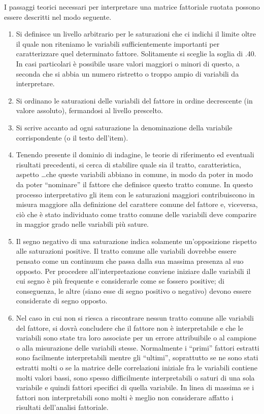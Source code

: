 \documentclass[
  11pt,
]{krantz}
\theoremstyle{definition}
\theoremstyle{definition}
\theoremstyle{definition}
\theoremstyle{definition}
\theoremstyle{remark}
\begin{document}
I passaggi teorici necessari per interpretare una matrice fattoriale ruotata possono essere descritti nel modo seguente.

\begin{enumerate}
\def\labelenumi{\arabic{enumi}.}
\item
  Si definisce un livello arbitrario per le saturazioni che ci indichi il limite oltre il quale non riteniamo le variabili sufficientemente importanti per caratterizzare quel determinato fattore. Solitamente si sceglie la soglia di .40. In casi particolari è possibile usare valori maggiori o minori di questo, a seconda che si abbia un numero ristretto o troppo ampio di variabili da interpretare.
\item
  Si ordinano le saturazioni delle variabili del fattore in ordine decrescente (in valore assoluto), fermandosi al livello prescelto.
\item
  Si scrive accanto ad ogni saturazione la denominazione della variabile corrispondente (o il testo dell'item).
\item
  Tenendo presente il dominio di indagine, le teorie di riferimento ed eventuali risultati precedenti, si cerca di stabilire quale sia il tratto, caratteristica, aspetto \ldots che queste variabili abbiano in comune, in modo da poter in modo da poter ``nominare'' il fattore che definisce questo tratto comune. In questo processo interpretativo gli item con le saturazioni maggiori contribuiscono in misura maggiore alla definizione del carattere comune del fattore e, viceversa, ciò che è stato individuato come tratto comune delle variabili deve comparire in maggior grado nelle variabili più sature.
\item
  Il segno negativo di una saturazione indica solamente un'opposizione rispetto alle saturazioni positive. Il tratto comune alle variabili dovrebbe essere pensato come un continuum che passa dalla sua massima presenza al suo opposto. Per procedere all'interpretazione conviene iniziare dalle variabili il cui segno è più frequente e considerarle come se fossero positive; di conseguenza, le altre (siano esse di segno positivo o negativo) devono essere considerate di segno opposto.
\item
  Nel caso in cui non si riesca a riscontrare nessun tratto comune alle variabili del fattore, si dovrà concludere che il fattore non è interpretabile e che le variabili sono state tra loro associate per un errore attribuibile o al campione o alla misurazione delle variabili stesse. Normalmente i ``primi'' fattori estratti sono facilmente interpretabili mentre gli ``ultimi'', soprattutto se ne sono stati estratti molti o se la matrice delle correlazioni iniziale fra le variabili contiene molti valori bassi, sono spesso difficilmente interpretabili o saturi di una sola variabile e quindi fattori specifici di quella variabile. In linea di massima se i fattori non interpretabili sono molti è meglio non considerare affatto i risultati dell'analisi fattoriale.
\end{enumerate}
\end{document}
